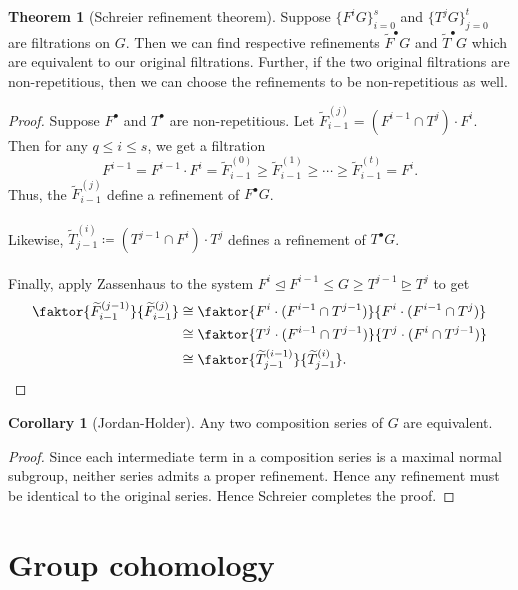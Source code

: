 \documentclass[10pt,letterpaper,cm]{nupset}
\theoremstyle{definition}
\theoremstyle{theorem}
\newtheorem{theorem}[definition]{Theorem}
\newtheorem{corollary}[definition]{Corollary}
\theoremstyle{remark}
\newcommand{\1}{\mathbf{1}}
\newcommand{\0}{\vec 0}
\begin{document}
\begin{theorem}[Schreier refinement theorem]
Suppose $\{F^iG\}_{i=0}^s$ and $\{T^jG\}_{j=0}^t$ are filtrations on $G$. Then we can find respective refinements $\widetilde{F}^{\bullet}G$ and $\widetilde{T}^{\bullet}G$ which are equivalent to our original filtrations. Further, if the two original filtrations are non-repetitious, then we can choose the refinements to be non-repetitious as well. 
\end{theorem}
\begin{proof}
Suppose $F^{\bullet}$ and $T^{\bullet}$ are non-repetitious. Let $\widetilde{F}_{i-1}^{(j)} =  (F^{i-1}\cap T^j) \cdot F^i$. Then for any $q\leq i \leq s$, we get a filtration $$F^{i-1} = F^{i-1}\cdot F^i =\widetilde{F}_{i-1}^{(0)}\geq \widetilde{F}_{i-1}^{(1)}\geq \cdots \geq \widetilde{F}_{i-1}^{(t)} = F^i.$$ Thus, the $\widetilde{F}_{i-1}^{(j)}$ define a refinement of $F^{\bullet}G$. 
\\ \\ Likewise, $\widetilde{T}_{j-1}^{(i)} \coloneqq  (T^{j-1}\cap F^i) \cdot T^j$ defines a refinement of $T^{\bullet}G$.
\\ \\ Finally, apply Zassenhaus to the system $F^i \unlhd F^{i-1} \leq G \geq T^{j-1} \unrhd T^j$ to get
\begin{align*}
\faktor{\widetilde{F}_{i-1}^{(j-1)}}{\widetilde{F}_{i-1}^{(j)}} & \cong \faktor{F^i\cdot (F^{i-1} \cap T^{j-1})}{F^i \cdot (F^{i-1} \cap T^j)}
\\ &  \cong \faktor{T^j \cdot (F^{i-1} \cap T^{j-1})}{T^j\cdot (F^i \cap T^{j-1})}
\\ &  \cong   \faktor{\widetilde{T}_{j-1}^{(i-1)}}{\widetilde{T}_{j-1}^{(i)}} .
\end{align*}
\end{proof}

\begin{corollary}[Jordan-Holder]
Any two composition series of $G$ are equivalent.
\end{corollary}
\begin{proof}
Since each intermediate term in a composition series is a maximal normal subgroup, neither series admits a proper refinement. Hence any refinement must be identical to the original series. Hence Schreier completes the proof.
\end{proof}

\section{Group cohomology}
\end{document}
